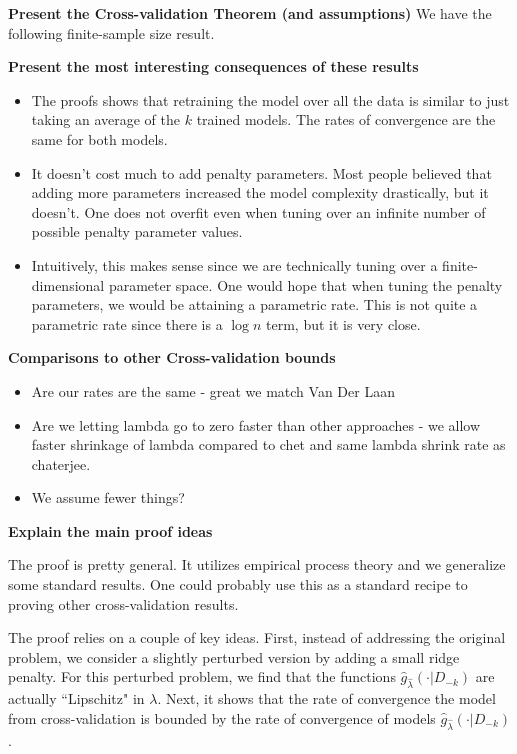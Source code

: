 \documentclass[12pt]{article}
\begin{document}
\textbf{Present the Cross-validation Theorem (and assumptions)}
We have the following finite-sample size result.

\textbf{Present the most interesting consequences of these results}
\begin{itemize}
\item{The proofs shows that retraining the model over all the data is similar to just taking an average of the $k$ trained models. The rates of convergence are the same for both models.}
\item{It doesn't cost much to add penalty parameters. Most people believed that adding more parameters increased the model complexity drastically, but it doesn't. One does not overfit even when tuning over an infinite number of possible penalty parameter values.}
\item{Intuitively, this makes sense since we are technically tuning over a finite-dimensional parameter space. One would hope that when tuning the penalty parameters, we would be attaining a parametric rate. This is not quite a parametric rate since there is a $\log n$ term, but it is very close.}
\end{itemize}

\textbf{Comparisons to other Cross-validation bounds}
\begin{itemize}
\item{Are our rates are the same - great we match Van Der Laan}
\item{Are we letting lambda go to zero faster than other approaches - we allow faster shrinkage of lambda compared to chet and same lambda shrink rate as chaterjee.}
\item{We assume fewer things?}
\end{itemize}


\textbf{Explain the main proof ideas}

The proof is pretty general. It utilizes empirical process theory and we generalize some standard results. One could probably use this as a standard recipe to proving other cross-validation results.

The proof relies on a couple of key ideas. First, instead of addressing the original problem, we consider a slightly perturbed version by adding a small ridge penalty. For this perturbed problem, we find that the functions $\hat{g}_{\hat \lambda}(\cdot|D_{-k})$ are actually ``Lipschitz" in $\lambda$. Next, it shows that the rate of convergence the model from cross-validation is bounded by the rate of convergence of models $\hat{g}_{\hat \lambda}(\cdot|D_{-k})$. 
\end{document}
